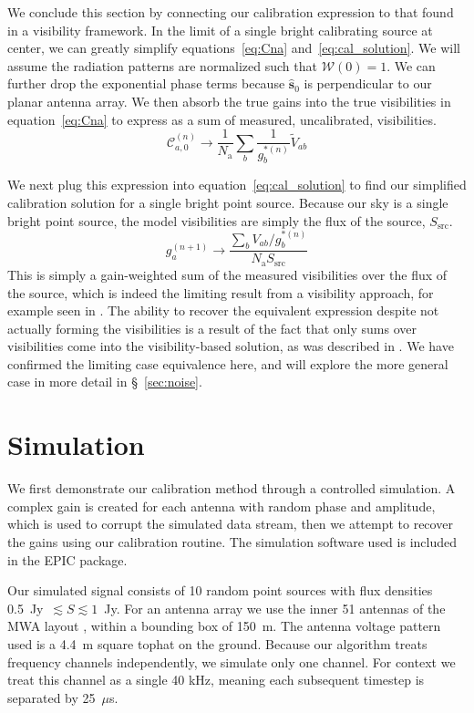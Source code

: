 \documentclass[a4paper,fleqn,usenatbib]{mnras}
\newcommand{\Nant}{\ensuremath{N_{\mathrm{a}}}}
\newcommand{\spix}{\ensuremath{\hat{\mathbf{s}}_{0}}}
\newcommand{\V}{\ensuremath{\widetilde{V}}}
\begin{document}
We conclude this section by connecting our calibration expression to that found in a visibility 
framework. In the limit of a single bright calibrating source at center, we can greatly 
simplify equations~\ref{eq:Cna} and~\ref{eq:cal_solution}. We will assume the radiation patterns are 
normalized such that $\mathcal{W}(0)=1$. We can further drop the exponential phase terms 
because $\spix$ is perpendicular to our planar antenna array. We then absorb the true gains into the true visibilities in 
equation~\ref{eq:Cna} to express as a sum of measured, uncalibrated, visibilities.
\begin{equation}
\mathcal{C}^{(n)}_{a,0} \rightarrow \frac{1}{\Nant}\sum_b \frac{1}{g^{*(n)}_b} \V_{ab}
\end{equation}

We next plug this expression into equation~\ref{eq:cal_solution} to find our simplified 
calibration solution for a single bright point source. Because our sky is a single bright point 
source, the model visibilities are simply the flux of the source, $S_{\mathrm{src}}$.
\begin{equation}
g^{(n+1)}_a \rightarrow \frac{\sum_b  V_{ab}/g^{*(n)}_b}{\Nant S_{\mathrm{src}}}
\end{equation}
This is simply a gain-weighted sum of the measured visibilities over the flux of the source, 
which is indeed the limiting result from a visibility approach, for example seen in \citealt{mit08}. 
The ability to recover the equivalent expression despite not actually forming the visibilities is a 
result of the fact that only sums over visibilities come into the visibility-based solution, as was described in 
\citealt{mor11}. We have confirmed the limiting case equivalence here, and will explore the 
more general case in more detail in \S~\ref{sec:noise}.

\section{Simulation}\label{sec:sim}
We first demonstrate our calibration method through a controlled simulation. A complex gain is 
created for each antenna with random phase and amplitude, which is used to corrupt the 
simulated data stream, then we attempt to recover the gains using our calibration routine. The 
simulation software used is included in the EPIC package.

Our simulated signal consists of 10 random point sources with flux densities 0.5~Jy~$\lesssim 
S \lesssim 1$~Jy. For an antenna array we use the inner 51 antennas of the MWA layout 
\citep{bea12}, within a bounding box of 150~m. The antenna voltage pattern used is a 4.4~m 
square tophat on the ground. Because our algorithm treats frequency channels independently, 
we simulate only one channel. For context we treat this channel as a single 40 kHz, meaning 
each subsequent timestep is separated by 25~$\mu$s.
\end{document}
